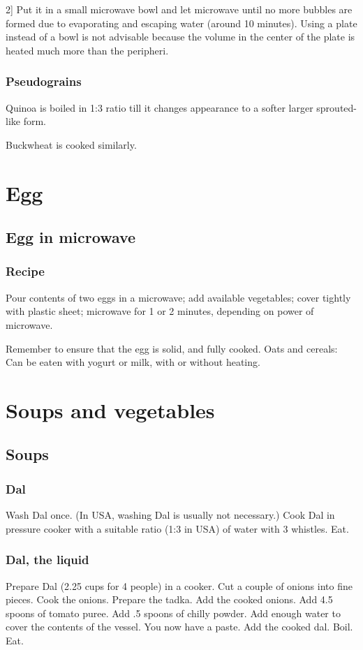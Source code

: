 \documentclass[oneside, article]{memoir}
\begin{document}
2] Put it in a small microwave bowl and let microwave until no more bubbles are formed due to evaporating and escaping water (around 10 minutes). Using a plate instead of a bowl is not advisable because the volume in the center of the plate is heated much more than the peripheri.

\subsection{Pseudograins}
Quinoa is boiled in 1:3 ratio till it changes appearance to a softer larger sprouted-like form.

Buckwheat is cooked similarly.

\chapter{Egg}
\section{Egg in microwave}
\subsection{Recipe}
Pour contents of two eggs in a microwave; add available vegetables; cover tightly with plastic sheet; microwave for 1 or 2 minutes, depending on power of microwave.

Remember to ensure that the egg is solid, and fully cooked.
Oats and cereals:
Can be eaten with yogurt or milk, with or without heating.

\chapter{Soups and vegetables}
\section{Soups}
\subsection{Dal}
Wash Dal once. (In USA, washing Dal is usually not necessary.) Cook Dal in pressure cooker with a suitable ratio (1:3 in USA) of water with 3 whistles. Eat.

\subsection{Dal, the liquid}
Prepare Dal (2.25 cups for 4 people) in a cooker. Cut a couple of onions into fine pieces. Cook the onions. Prepare the tadka. Add the cooked onions. Add 4.5 spoons of tomato puree. Add .5 spoons of chilly powder. Add enough water to cover the contents of the vessel. You now have a paste. Add the cooked dal. Boil. Eat.
\end{document}
